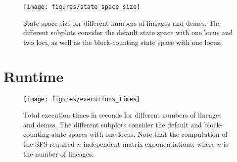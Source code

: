 \begin{figure}[H]
    \centering
    \texttt{[image: figures/state\_space\_size]}
    \caption{
        State space size for different numbers of lineages and demes.
        The different subplots consider the default state space with one locus and two loci, as well as the block-counting state space with one locus.
    }
    \label{fig:state_space_sizes}
\end{figure}


\section{Runtime}\label{sec:runtime-appendix}

\begin{figure}[H]
    \centering
    \texttt{[image: figures/executions\_times]}
    \caption{
        Total execution times in seconds for different numbers of lineages and demes.
        The different subplots consider the default and block-counting state spaces with one locus.
        Note that the computation of the SFS required $n$ independent matrix exponentiations, where $n$ is the number of lineages.
    }
    \label{fig:executions_times}
\end{figure}

